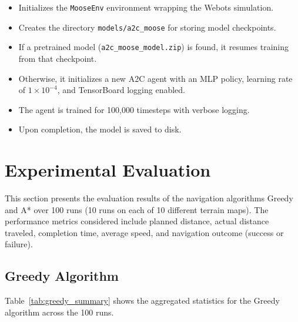 \documentclass[11pt,twocolumn]{article}
\begin{document}
\begin{itemize}
    \item Initializes the \texttt{MooseEnv} environment wrapping the Webots simulation.
    \item Creates the directory \texttt{models/a2c\_moose} for storing model checkpoints.
    \item If a pretrained model (\texttt{a2c\_moose\_model.zip}) is found, it resumes training from that checkpoint.
    \item Otherwise, it initializes a new A2C agent with an MLP policy, learning rate of $1 \times 10^{-4}$, and TensorBoard logging enabled.
    \item The agent is trained for 100,000 timesteps with verbose logging.
    \item Upon completion, the model is saved to disk.
\end{itemize}

\section{Experimental Evaluation}

This section presents the evaluation results of the navigation algorithms Greedy and A* over 100 runs (10 runs on each of 10 different terrain maps). The performance metrics considered include planned distance, actual distance traveled, completion time, average speed, and navigation outcome (success or failure).

\subsection{Greedy Algorithm}

Table~\ref{tab:greedy_summary} shows the aggregated statistics for the Greedy algorithm across the 100 runs.

\begin{table}[ht]
\centering
\caption{Summary statistics for the Greedy algorithm (100 runs).}
\label{tab:greedy_summary}
\end{table}
\end{document}

